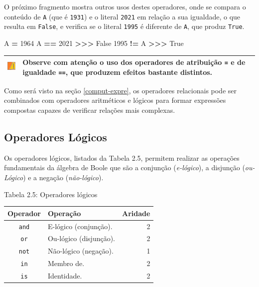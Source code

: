 \documentclass[
]{book}
\newenvironment{Shaded}{\begin{snugshade}}{\end{snugshade}}
\newcommand{\DecValTok}[1]{\textcolor[rgb]{0.00,0.00,0.81}{#1}}
\newcommand{\NormalTok}[1]{#1}
\newcommand{\OperatorTok}[1]{\textcolor[rgb]{0.81,0.36,0.00}{\textbf{#1}}}
\newcommand{\VariableTok}[1]{\textcolor[rgb]{0.00,0.00,0.00}{#1}}
\begin{document}
O próximo fragmento mostra outros usos destes operadores, onde se compara o conteúdo de \texttt{A} (que é \texttt{1931}) e o literal \texttt{2021} em relação a sua igualdade, o que resulta em \texttt{False}, e verifica se o literal \texttt{1995} é diferente de \texttt{A}, que produz \texttt{True}.

\begin{Shaded}
\begin{Highlighting}[]
\NormalTok{A }\OperatorTok{=} \DecValTok{1964}
\NormalTok{A }\OperatorTok{==} \DecValTok{2021}
\OperatorTok{\textgreater{}\textgreater{}\textgreater{}} \VariableTok{False}
\DecValTok{1995} \OperatorTok{!=}\NormalTok{ A}
\OperatorTok{\textgreater{}\textgreater{}\textgreater{}} \VariableTok{True}
\end{Highlighting}
\end{Shaded}

\begin{longtable}[]{@{}
  >{\centering\arraybackslash}p{}
  >{\raggedright\arraybackslash}p{}@{}}
\toprule
\includegraphics{images/warn.png} & Observe com atenção o uso dos operadores de atribuição \texttt{=} e de igualdade \texttt{==}, que produzem efeitos bastante distintos. \\
\midrule
\endhead
\bottomrule
\end{longtable}

Como será visto na seção \ref{comput-expre}, os operadores relacionais pode ser combinados com operadores aritméticos e lógicos para formar expressões compostas capazes de verificar relações mais complexas.

\hypertarget{comput-opera-logic}{%
\subsection{Operadores Lógicos}\label{comput-opera-logic}}

Os operadores lógicos, listados da Tabela 2.5, permitem realizar as operações fundamentais da álgebra de Boole que são a conjunção (\emph{e-lógico}), a disjunção (\emph{ou-Lógico}) e a negação (\emph{não-lógico}).

Tabela 2.5: Operadores lógicos

\begin{longtable}[]{@{}clr@{}}
\toprule
Operador & Operação & Aridade \\
\midrule
\endhead
\texttt{and} & E-lógico (conjunção). & 2 \\
\texttt{or} & Ou-lógico (disjunção). & 2 \\
\texttt{not} & Não-lógico (negação). & 1 \\
\texttt{in} & Membro de. & 2 \\
\texttt{is} & Identidade. & 2 \\
\bottomrule
\end{longtable}
\end{document}
